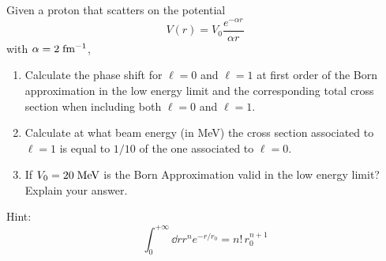 \newpage
\setcounter{equation}{0}

\begin{esercizio}
   Given a proton that scatters on the potential
   \begin{equation*}
      V(r)
      =V_0 \frac{e^{-\alpha r}}{\alpha r}
   \end{equation*}
   with $\alpha=2 \; \rm fm^{-1}$,
   \begin{enumerate}[label=\alph*), leftmargin=0.6cm]
      \item Calculate the phase shift for $\ell=0$ and $\ell=1$ at first order of the Born approximation in the low energy limit and the corresponding total cross section when including both $\ell=0$ and $\ell=1$.
      \item Calculate at what beam energy (in MeV) the cross section associated to $\ell=1$ is equal to $1/10$ of the one associated to $\ell=0$.
      \item If $V_0=20 \rm \; MeV$ is the Born Approximation valid in the low energy limit? Explain your answer.
   \end{enumerate}
   Hint:
   \begin{equation*}
      \int_{0}^{+\infty} \dd{r} r^n e^{-r/r_0}
      =n! \, r_0^{n+1}
   \end{equation*}
\end{esercizio}
